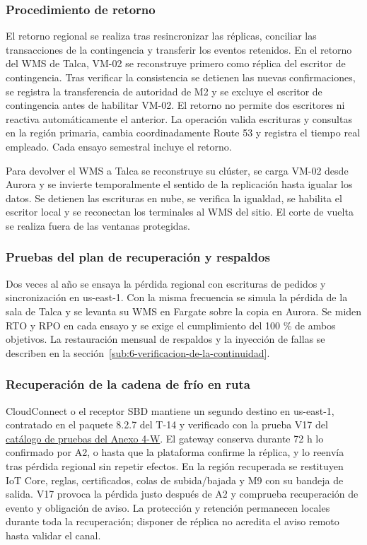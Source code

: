 \subsubsection{Procedimiento de retorno}

El retorno regional se realiza tras resincronizar las réplicas, conciliar las transacciones de la contingencia y transferir los eventos retenidos. En el retorno del WMS de Talca, VM-02 se reconstruye primero como réplica del escritor de contingencia. Tras verificar la consistencia se detienen las nuevas confirmaciones, se registra la transferencia de autoridad de M2 y se excluye el escritor de contingencia antes de habilitar VM-02. El retorno no permite dos escritores ni reactiva automáticamente el anterior. La operación valida escrituras y consultas en la región primaria, cambia coordinadamente Route 53 y registra el tiempo real empleado. Cada ensayo semestral incluye el retorno.

Para devolver el WMS a Talca se reconstruye su clúster, se carga VM-02 desde Aurora y se invierte temporalmente el sentido de la replicación hasta igualar los datos. Se detienen las escrituras en nube, se verifica la igualdad, se habilita el escritor local y se reconectan los terminales al WMS del sitio. El corte de vuelta se realiza fuera de las ventanas protegidas.

\subsubsection{Pruebas del plan de recuperación y respaldos}

Dos veces al año se ensaya la pérdida regional con escrituras de pedidos y sincronización en us-east-1. Con la misma frecuencia se simula la pérdida de la sala de Talca y se levanta su WMS en Fargate sobre la copia en Aurora. Se miden RTO y RPO en cada ensayo y se exige el cumplimiento del 100 \% de ambos objetivos. La restauración mensual de respaldos y la inyección de fallas se describen en la sección~\ref{sub:6-verificacion-de-la-continuidad}.

\label{fuente-06-e-sitio-secundario-fin}

\subsubsection{Recuperación de la cadena de frío en ruta}
CloudConnect o el receptor SBD mantiene un segundo destino en us-east-1, contratado en el paquete 8.2.7 del T-14 y verificado con la prueba V17 del \href{LAFROX-Subdocumento4-Anexos.pdf#tab:frio-v1-v21}{catálogo de pruebas del Anexo 4-W}. El gateway conserva durante 72 h lo confirmado por A2, o hasta que la plataforma confirme la réplica, y lo reenvía tras pérdida regional sin repetir efectos. En la región recuperada se restituyen IoT Core, reglas, certificados, colas de subida/bajada y M9 con su bandeja de salida. V17 provoca la pérdida justo después de A2 y comprueba recuperación de evento y obligación de aviso. La protección y retención permanecen locales durante toda la recuperación; disponer de réplica no acredita el aviso remoto hasta validar el canal.
